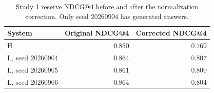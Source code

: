 \begin{table}[htbp]\centering\small
\caption{Study 1 reserve NDCG@4 before and after the normalization correction. Only seed 20260904 has generated answers.}\label{tab:ndcg1}
\begin{tabular}{lrr}\toprule
System & Original NDCG@4 & Corrected NDCG@4\\\midrule
H & 0.850 & 0.769\\
L, seed 20260904 & 0.864 & 0.807\\
L, seed 20260905 & 0.861 & 0.800\\
L, seed 20260906 & 0.864 & 0.804\\
\bottomrule\end{tabular}\end{table}
